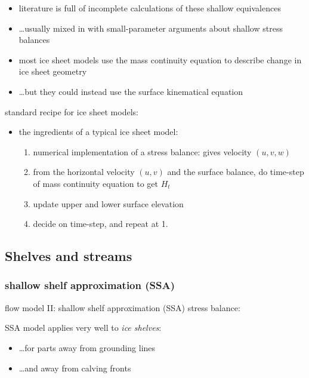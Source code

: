 \documentclass[titlepage,letterpaper,final,12pt]{scrartcl}
\newcommand{\alert}[1]{\emph{#1}}
\begin{document}
\begin{itemize}
\item literature is full of incomplete calculations of these shallow equivalences
\item \dots usually mixed in with small-parameter arguments about shallow stress balances
\item most ice sheet models use the mass continuity equation to describe change in ice sheet geometry
\item \dots but they could instead use the surface kinematical equation
\end{itemize}

standard recipe for ice sheet models:

\begin{itemize}
\item the ingredients of a typical ice sheet model:
  \begin{enumerate}
  \item numerical implementation of a stress balance: gives velocity $(u,v,w)$
  \item from the horizontal velocity $(u,v)$ and the surface balance, do time-step of mass continuity equation to get $H_t$
  \item update upper and lower surface elevation
  \item decide on time-step, and repeat at 1.
  \end{enumerate}
\end{itemize}



\subsection{Shelves and streams}


\subsubsection*{shallow shelf approximation (SSA)}

flow model II: shallow shelf approximation (SSA) stress balance:
  
SSA model applies very well to \alert{ice shelves}:
\begin{itemize}
\item \dots for parts away from grounding lines
\item \dots and away from calving fronts
\end{itemize}
\end{document}
